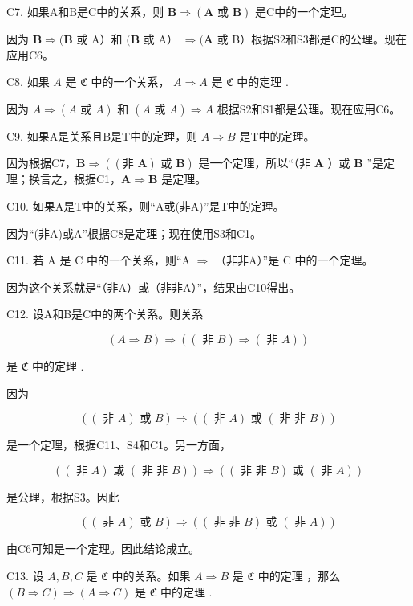 C7. 如果A和B是C中的关系，则 \(\mathbf{B} \Longrightarrow (\mathbf{A} \text{ 或 } \mathbf{B})\) 是C中的一个定理。

因为 \(\boldsymbol{B}\Longrightarrow(\boldsymbol{B}\) 或 A）和 \((\boldsymbol{B}\) 或 A） \(\Longrightarrow(\boldsymbol{A}\) 或 B）根据S2和S3都是C的公理。现在应用C6。

C8. 如果 \(A\) 是 \(\mathfrak{C}\) 中的一个关系， \(A \Longrightarrow A\) 是 \(\mathfrak{C}\) 中的定理 .

因为 \(A \Longrightarrow (A \text{ 或 } A)\) 和 \((A \text{ 或 } A) \Longrightarrow A\) 根据S2和S1都是公理。现在应用C6。

C9. 如果A是关系且B是T中的定理，则 \(A \Longrightarrow B\) 是T中的定理。

因为根据C7，\(\boldsymbol{B} \Rightarrow ((\text{非 } \boldsymbol{A}) \text{ 或 } \boldsymbol{B})\) 是一个定理，所以“（非 \(\boldsymbol{A}\) ）或 \(\boldsymbol{B}\) ”是定理；换言之，根据C1，\(\boldsymbol{A} \Rightarrow \boldsymbol{B}\) 是定理。

C10. 如果A是T中的关系，则“A或(非A)”是T中的定理。

因为“(非A)或A”根据C8是定理；现在使用S3和C1。

C11. 若 A 是 C 中的一个关系，则“A \(\Longrightarrow\) （非非A）”是 C 中的一个定理。

因为这个关系就是“（非A）或（非非A）”，结果由C10得出。

C12. 设A和B是C中的两个关系。则关系

\[
(A \Rightarrow B) \Rightarrow ((\text { 非 } B) \Rightarrow (\text { 非 } A))
\]

是 \(\mathfrak{C}\) 中的定理 .

因为

\[
((\text { 非 } A) \text { 或 } B) \Longrightarrow ((\text { 非 } A) \text { 或 } (\text { 非   非 } B))
\]

是一个定理，根据C11、S4和C1。另一方面，

\[
((\text { 非 } A) \text { 或 } (\text { 非   非 } B)) \Longrightarrow ((\text { 非   非 } B) \text { 或 } (\text { 非 } A))
\]

是公理，根据S3。因此

\[
((\text { 非 } A) \text { 或 } B) \Longrightarrow ((\text { 非   非 } B) \text { 或 } (\text { 非 } A))
\]

由C6可知是一个定理。因此结论成立。

C13. 设 \(A, B, C\) 是 \(\mathfrak{C}\) 中的关系。如果 \(A \Rightarrow B\) 是 \(\mathfrak{C}\) 中的定理 ，那么 \((B \Rightarrow C) \Rightarrow (A \Rightarrow C)\) 是 \(\mathfrak{C}\) 中的定理 .


